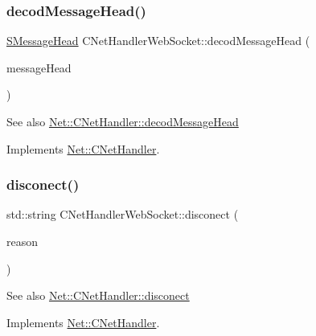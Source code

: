 \subsubsection{\texorpdfstring{decod\+Message\+Head()}{decodMessageHead()}}
{\footnotesize\ttfamily \mbox{\hyperlink{struct_net_1_1_s_message_head}{S\+Message\+Head}} C\+Net\+Handler\+Web\+Socket\+::decod\+Message\+Head (\begin{DoxyParamCaption}\item[{const std\+::string \&}]{message\+Head }\end{DoxyParamCaption})\hspace{0.3cm}{\ttfamily [virtual]}}

\begin{DoxySeeAlso}{See also}
\mbox{\hyperlink{class_net_1_1_c_net_handler_a992b6c07fcda7c7f8ee411773b7dc3c6}{Net\+::\+C\+Net\+Handler\+::decod\+Message\+Head}} 
\end{DoxySeeAlso}


Implements \mbox{\hyperlink{class_net_1_1_c_net_handler_a992b6c07fcda7c7f8ee411773b7dc3c6}{Net\+::\+C\+Net\+Handler}}.

\mbox{\label{class_net_1_1_c_net_handler_web_socket_ac5a2c812c7a1fdb426265a4590409ae3}} 
\subsubsection{\texorpdfstring{disconect()}{disconect()}}
{\footnotesize\ttfamily std\+::string C\+Net\+Handler\+Web\+Socket\+::disconect (\begin{DoxyParamCaption}\item[{Disconnect\+Reason}]{reason }\end{DoxyParamCaption})\hspace{0.3cm}{\ttfamily [virtual]}}

\begin{DoxySeeAlso}{See also}
\mbox{\hyperlink{class_net_1_1_c_net_handler_a1f43099b8631032d4555a326dd71f4d1}{Net\+::\+C\+Net\+Handler\+::disconect}} 
\end{DoxySeeAlso}


Implements \mbox{\hyperlink{class_net_1_1_c_net_handler_a1f43099b8631032d4555a326dd71f4d1}{Net\+::\+C\+Net\+Handler}}.

